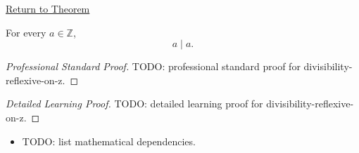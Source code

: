 \newpage
{}
\label{prf:divisibility-reflexive-on-z}

\begin{remark*}[Return]
\hyperref[prop:divisibility-reflexive-on-z]{Return to Theorem}
\end{remark*}

\begin{proposition*}
For every $a\in\mathbb{Z}$,
\[
a\mid a.
\]
\end{proposition*}

\begin{proof}[Professional Standard Proof]
\LRAProofBodyStart
TODO: professional standard proof for divisibility-reflexive-on-z.
\end{proof}

\begin{proof}[Detailed Learning Proof]
\LRAProofBodyStart
TODO: detailed learning proof for divisibility-reflexive-on-z.
\end{proof}

\begin{remark*}
\end{remark*}

\begin{dependencies}
\begin{itemize}
  \item TODO: list mathematical dependencies.
\end{itemize}
\end{dependencies}

\clearpage
